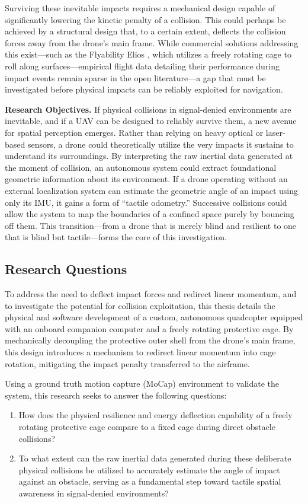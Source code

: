 Surviving these inevitable impacts requires a mechanical design capable of significantly lowering the kinetic penalty of a collision. This could perhaps be achieved by a structural design that, to a certain extent, deflects the collision forces away from the drone's main frame. While commercial solutions addressing this exist---such as the Flyability Elios \cite{briod2014collision}, which utilizes a freely rotating cage to roll along surfaces---empirical flight data detailing their performance during impact events remain sparse in the open literature---a gap that must be investigated before physical impacts can be reliably exploited for navigation.

\textbf{Research Objectives.}
If physical collisions in signal-denied environments are inevitable, and if a UAV can be designed to reliably survive them, a new avenue for spatial perception emerges. Rather than relying on heavy optical or laser-based sensors, a drone could theoretically utilize the very impacts it sustains to understand its surroundings. By interpreting the raw inertial data generated at the moment of collision, an autonomous system could extract foundational geometric information about its environment. If a drone operating without an external localization system can estimate the geometric angle of an impact using only its IMU, it gains a form of ``tactile odometry.'' Successive collisions could allow the system to map the boundaries of a confined space purely by bouncing off them. This transition---from a drone that is merely blind and resilient to one that is blind but tactile---forms the core of this investigation.

\subsection{Research Questions}

To address the need to deflect impact forces and redirect linear momentum, and to investigate the potential for collision exploitation, this thesis details the physical and software development of a custom, autonomous quadcopter equipped with an onboard companion computer and a freely rotating protective cage. By mechanically decoupling the protective outer shell from the drone's main frame, this design introduces a mechanism to redirect linear momentum into cage rotation, mitigating the impact penalty transferred to the airframe.

Using a ground truth motion capture (MoCap) environment to validate the system, this research seeks to answer the following questions:

\begin{enumerate}
    \item How does the physical resilience and energy deflection capability of a freely rotating protective cage compare to a fixed cage during direct obstacle collisions?
    \item To what extent can the raw inertial data generated during these deliberate physical collisions be utilized to accurately estimate the angle of impact against an obstacle, serving as a fundamental step toward tactile spatial awareness in signal-denied environments?
\end{enumerate}
